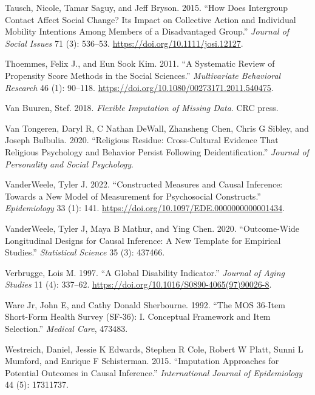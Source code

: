 \documentclass[
  singlecolumn]{report}
\newlength{\cslhangindent}
\newlength{\cslentryspacingunit} %
\newenvironment{CSLReferences}[2] %
 {%
  \setlength{\parindent}{0pt}
  \ifodd #1
  \let\oldpar\par
  \def\par{\hangindent=\cslhangindent\oldpar}
  \fi
  \setlength{\parskip}{#2\cslentryspacingunit}
 }%
 {}
\begin{document}
\begin{CSLReferences}{1}{0}
\leavevmode{}%
Tausch, Nicole, Tamar Saguy, and Jeff Bryson. 2015. {``How Does
Intergroup Contact Affect Social Change? Its Impact on Collective Action
and Individual Mobility Intentions Among Members of a Disadvantaged
Group.''} \emph{Journal of Social Issues} 71 (3): 536--53.
\url{https://doi.org/10.1111/josi.12127}.

\leavevmode{}%
Thoemmes, Felix J., and Eun Sook Kim. 2011. {``A Systematic Review of
Propensity Score Methods in the Social Sciences.''} \emph{Multivariate
Behavioral Research} 46 (1): 90--118.
\url{https://doi.org/10.1080/00273171.2011.540475}.

\leavevmode{}%
Van Buuren, Stef. 2018. \emph{Flexible Imputation of Missing Data}. CRC
press.

\leavevmode{}%
Van Tongeren, Daryl R, C Nathan DeWall, Zhansheng Chen, Chris G Sibley,
and Joseph Bulbulia. 2020. {``Religious Residue: Cross-Cultural Evidence
That Religious Psychology and Behavior Persist Following
Deidentification.''} \emph{Journal of Personality and Social
Psychology}.

\leavevmode{}%
VanderWeele, Tyler J. 2022. {``Constructed Measures and Causal
Inference: Towards a New Model of Measurement for Psychosocial
Constructs.''} \emph{Epidemiology} 33 (1): 141.
\url{https://doi.org/10.1097/EDE.0000000000001434}.

\leavevmode{}%
VanderWeele, Tyler J, Maya B Mathur, and Ying Chen. 2020.
{``Outcome-Wide Longitudinal Designs for Causal Inference: A New
Template for Empirical Studies.''} \emph{Statistical Science} 35 (3):
437466.

\leavevmode{}%
Verbrugge, Lois M. 1997. {``A Global Disability Indicator.''}
\emph{Journal of Aging Studies} 11 (4): 337--62.
\url{https://doi.org/10.1016/S0890-4065(97)90026-8}.

\leavevmode{}%
Ware Jr, John E, and Cathy Donald Sherbourne. 1992. {``The MOS 36-Item
Short-Form Health Survey (SF-36): I. Conceptual Framework and Item
Selection.''} \emph{Medical Care}, 473483.

\leavevmode{}%
Westreich, Daniel, Jessie K Edwards, Stephen R Cole, Robert W Platt,
Sunni L Mumford, and Enrique F Schisterman. 2015. {``Imputation
Approaches for Potential Outcomes in Causal Inference.''}
\emph{International Journal of Epidemiology} 44 (5): 17311737.


\end{CSLReferences}
\end{document}
